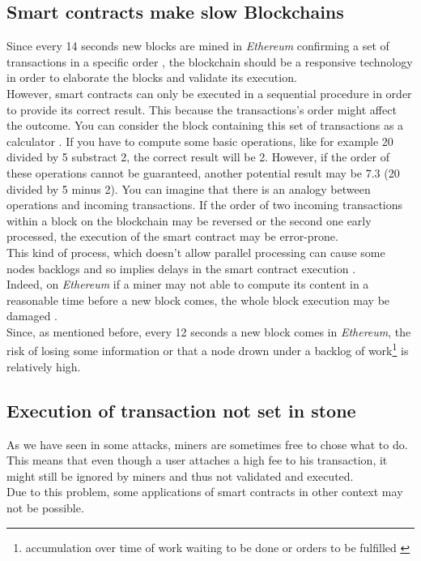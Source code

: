 \subsection{Smart contracts make slow Blockchains}
Since every 14 seconds new blocks are mined in \textit{Ethereum} \cite{sina} confirming a set of transactions in a specific order \cite{challenge3}, the blockchain should be a responsive technology in order to elaborate the blocks and validate its execution. \\
However, smart contracts can only be executed in a sequential procedure \cite{challenge3} in order to provide its correct result. This because the transactions's order might affect the outcome. You can consider the block containing this set of transactions as a calculator \cite{challenge1}. If you have to compute some basic operations, like for example 20 divided by 5 substract 2, the correct result will be 2. However, if the order of these operations cannot be guaranteed, another potential result may be 7.3 (20 divided by 5 minus 2). 
You can imagine that there is an analogy between operations and incoming transactions. If the order of two incoming transactions within a block on the blockchain may be reversed or the second one early processed, the execution of the smart contract may be error-prone. \\
This kind of process, which doesn't allow parallel processing can cause some nodes backlogs and so implies delays in the smart contract execution \cite{challenge1}. \\
Indeed, on \textit{Ethereum} if a miner may not able to compute its content in a reasonable time before a new block comes, the whole block execution may be damaged \cite{challenge1}. \\
Since, as mentioned before, every 12 seconds a new block comes in \textit{Ethereum}, the risk of losing some information or that a node drown under a backlog of work\footnote{accumulation over time of work waiting to be done or orders to be fulfilled \cite{challenge4}} is relatively high.

\subsection{Execution of transaction not set in stone}
As we have seen in some attacks, miners are sometimes free to chose what to do. This means that even though a user attaches a high fee to his transaction, it might still be ignored by miners and thus not validated and executed.\\
Due to this problem, some applications of smart contracts in other context may not be possible.


